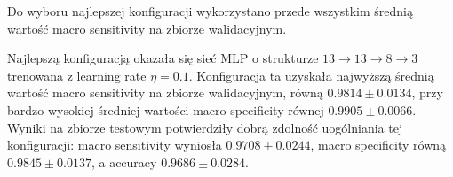 Do wyboru najlepszej konfiguracji wykorzystano przede wszystkim średnią wartość
macro sensitivity na zbiorze walidacyjnym.

Najlepszą konfiguracją okazała się sieć MLP o strukturze
\(13 \rightarrow 13 \rightarrow 8 \rightarrow 3\) trenowana z learning rate
\(\eta = 0.1\). Konfiguracja ta uzyskała najwyższą średnią wartość macro
sensitivity na zbiorze walidacyjnym, równą \(0.9814 \pm 0.0134\), przy bardzo
wysokiej średniej wartości macro specificity równej \(0.9905 \pm 0.0066\).
Wyniki na zbiorze testowym potwierdziły dobrą zdolność uogólniania tej
konfiguracji: macro sensitivity wyniosła \(0.9708 \pm 0.0244\), macro specificity
równą \(0.9845 \pm 0.0137\), a accuracy \(0.9686 \pm 0.0284\).
